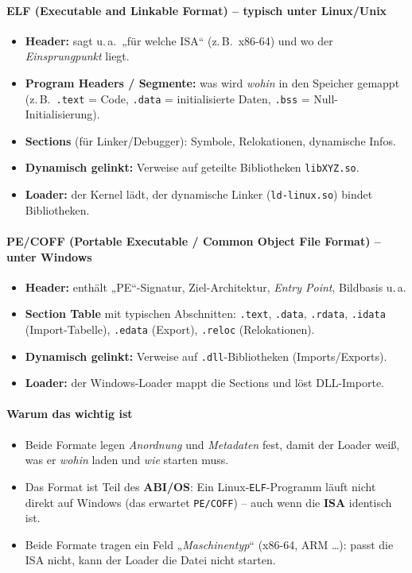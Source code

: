 \documentclass[../skript/main.tex]{subfiles}
\begin{document}
\paragraph{ELF (Executable and Linkable Format) – typisch unter Linux/Unix}
\begin{itemize}
	\item \textbf{Header:} sagt u.\,a.\ „für welche ISA“ (z.\,B.\ x86-64) und wo der \emph{Einsprungpunkt} liegt.
	\item \textbf{Program Headers / Segmente:} was wird \emph{wohin} in den Speicher gemappt
	(z.\,B.\ \texttt{.text} = Code, \texttt{.data} = initialisierte Daten, \texttt{.bss} = Null-Initialisierung).
	\item \textbf{Sections} (für Linker/Debugger): Symbole, Relokationen, dynamische Infos.
	\item \textbf{Dynamisch gelinkt:} Verweise auf geteilte Bibliotheken \texttt{libXYZ.so}.
	\item \textbf{Loader:} der Kernel lädt, der dynamische Linker (\texttt{ld-linux.so}) bindet Bibliotheken.
\end{itemize}

\paragraph{PE/COFF (Portable Executable / Common Object File Format) – unter Windows}
\begin{itemize}
	\item \textbf{Header:} enthält „PE“-Signatur, Ziel-Architektur, \emph{Entry Point}, Bildbasis u.\,a.
	\item \textbf{Section Table} mit typischen Abschnitten: \texttt{.text}, \texttt{.data}, \texttt{.rdata},
	\texttt{.idata} (Import-Tabelle), \texttt{.edata} (Export), \texttt{.reloc} (Relokationen).
	\item \textbf{Dynamisch gelinkt:} Verweise auf \texttt{.dll}-Bibliotheken (Imports/Exports).
	\item \textbf{Loader:} der Windows-Loader mappt die Sections und löst DLL-Importe.
\end{itemize}

\paragraph{Warum das wichtig ist}
\begin{itemize}
	\item Beide Formate legen \emph{Anordnung} und \emph{Metadaten} fest, damit der Loader weiß,
	was er \emph{wohin} laden und \emph{wie} starten muss.
	\item Das Format ist Teil des \textbf{ABI/OS}: Ein Linux-\texttt{ELF}-Programm läuft nicht direkt
	auf Windows (das erwartet \texttt{PE/COFF}) – auch wenn die \textbf{ISA} identisch ist.
	\item Beide Formate tragen ein Feld „\emph{Maschinentyp}“ (x86-64, ARM …): passt die ISA nicht,
	kann der Loader die Datei nicht starten.
\end{itemize}
\end{document}
